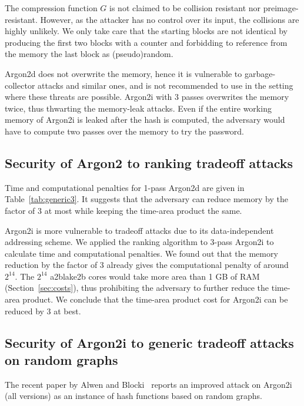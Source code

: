\documentclass[a4paper]{article}
\begin{document}
 The compression function $G$ is not claimed to be collision resistant nor preimage-resistant. However, as the attacker has no control over its input, the collisions are highly unlikely. We only take care that the starting blocks are not identical by producing the first two blocks with a counter and forbidding to reference from the memory the last block as (pseudo)random.

\textsf{Argon2d} does not overwrite the memory, hence it is vulnerable to garbage-collector attacks and similar ones, and is not recommended to use in the setting where these threats are possible. \textsf{Argon2i} with 3 passes overwrites the memory twice, thus thwarting the memory-leak attacks. Even if the entire working memory of \textsf{Argon2i} is leaked after the hash is computed, the adversary would have to compute two passes over the memory to try the password.



\subsection{Security of Argon2 to ranking tradeoff attacks}

Time and computational penalties for 1-pass \textsf{Argon2d} are given in Table~\ref{tab:generic3}. It suggests that the adversary can reduce memory by the factor of 3 at most
while keeping the time-area product the same.


\textsf{Argon2i} is more vulnerable to tradeoff attacks due to its data-independent addressing scheme. We applied the ranking algorithm to 3-pass \textsf{Argon2i} to calculate time and computational penalties. We found out  that the memory reduction by the factor of 3 already gives the computational penalty of around $2^{14}$.  The $2^{14}$ a2blake2b cores would take more area than 1 GB of RAM (Section~\ref{sec:costs}), thus prohibiting the adversary to further reduce the time-area product. We conclude that the time-area product cost for \textsf{Argon2i} can be reduced by 3 at best.

\subsection{Security of Argon2i to generic tradeoff attacks on random graphs}

The recent paper by Alwen and Blocki~\cite{AB16} reports an improved attack on Argon2i (all versions)  as an instance of
hash functions based on random graphs. 
\end{document}
